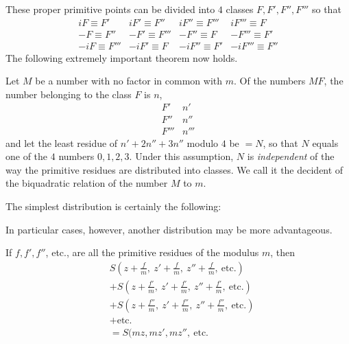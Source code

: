 These proper primitive points can be divided into $4$ classes $F,F',F'',F'''$ so that
\[
\begin{array}{llll}
iF\equiv F'&iF'\equiv F''&iF''\equiv F'''&iF'''\equiv F\\
-F\equiv F''&-F'\equiv F'''&-F''\equiv F&-F'''\equiv F'\\
-iF\equiv F'''&-iF'\equiv F&-iF''\equiv F'&-iF'''\equiv F''
\end{array}
\]
The following extremely important theorem now holds.

Let $M$ be a number with no factor in common with $m$. Of the numbers $MF$, the number belonging to the class $F$ is $n$,
\[
\begin{array}{cc}F'&n'\\F''&n''\\F'''&n'''\end{array}
\]
and let the least residue of $n'+2n''+3n''$ modulo $4$ be $=N$, so that $N$ equals one of the $4$ numbers $0,1,2,3$. Under this assumption, $N$ is \emph{independent} of the way the primitive residues are distributed into classes. We call it the decident of the biquadratic relation of the number $M$ to $m$.

The simplest distribution is certainly the following:
\begin{center}\resizebox{.35\textwidth}{!}{}\end{center}
In particular cases, however, another distribution may be more advantageous.

If $f,f',f''$, etc., are all the primitive residues of the modulus $m$, then
\[
\begin{aligned}
&S(z+\tfrac fm,\ z'+\tfrac fm,\ z''+\tfrac fm,\ \text{etc.})\\
&+S(z+\tfrac{f'}m,\ z'+\tfrac{f'}m,\ z''+\tfrac{f'}m,\ \text{etc.})\\
&+S(z+\tfrac{f''}m,\ z'+\tfrac{f''}m,\ z''+\tfrac{f''}m,\ \text{etc.})\\
&+\text{etc.}\\
&=S(mz,mz',mz'',\ \text{etc.}
\end{aligned}
\]
